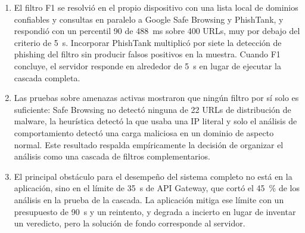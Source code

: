 \begin{enumerate}
	\item El filtro F1 se resolvió en el propio dispositivo con una lista local de dominios confiables y consultas en paralelo a Google Safe Browsing y PhishTank, y respondió con un percentil 90 de 488~ms sobre 400 URLs, muy por debajo del criterio de 5~s. Incorporar PhishTank multiplicó por siete la detección de phishing del filtro sin producir falsos positivos en la muestra. Cuando F1 concluye, el servidor responde en alrededor de 5~s en lugar de ejecutar la cascada completa.

	\item Las pruebas sobre amenazas activas mostraron que ningún filtro por sí solo es suficiente: Safe Browsing no detectó ninguna de 22 URLs de distribución de malware, la heurística detectó la que usaba una IP literal y solo el análisis de comportamiento detectó una carga maliciosa en un dominio de aspecto normal. Este resultado respalda empíricamente la decisión de organizar el análisis como una cascada de filtros complementarios.

	\item El principal obstáculo para el desempeño del sistema completo no está en la aplicación, sino en el límite de 35~s de API Gateway, que cortó el 45~\% de los análisis en la prueba de la cascada. La aplicación mitiga ese límite con un presupuesto de 90~s y un reintento, y degrada a incierto en lugar de inventar un veredicto, pero la solución de fondo corresponde al servidor.
\end{enumerate}
